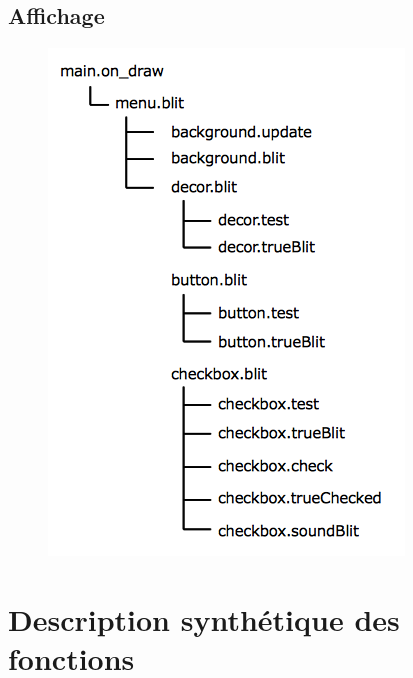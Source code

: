 \documentclass{article}
\begin{document}
\subsection{Affichage}
\begin{center}
\begin{figure}[h]
\includegraphics[scale=0.5]{arbre_ondraw.png}
\end{figure}
\end{center}
\newpage
\section{Description synthétique des fonctions}
\end{document}
